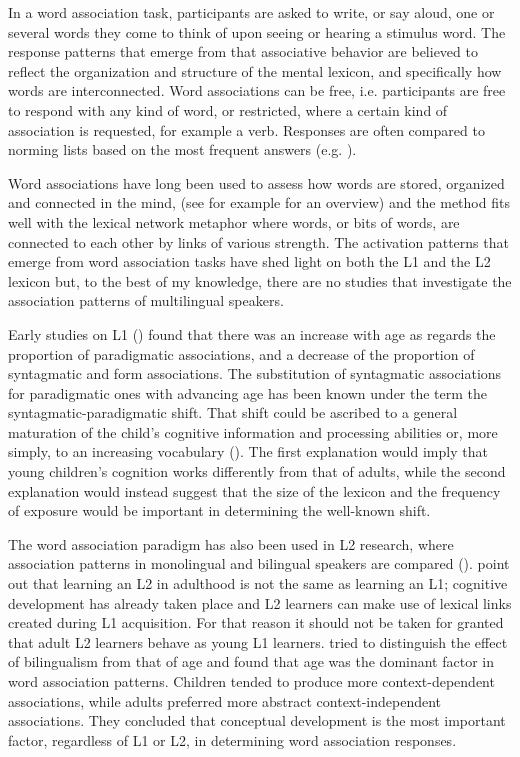 \documentclass[output=paper,colorlinks,citecolor=brown,nonflat]{langsci/langscibook}
\begin{document}
In a word association task, participants are asked to write, or say aloud, one or several words they come to think of upon seeing or hearing a stimulus word. The response patterns that emerge from that associative behavior are believed to reflect the organization and structure of the mental lexicon, and specifically how words are interconnected. Word associations can be free, i.e. participants are free to respond with any kind of word, or restricted, where a certain kind of association is requested, for example a verb. Responses are often compared to norming lists based on the most frequent answers (e.g. \citealt{PostmanKeppel1970}).

Word associations have long been used to assess how words are stored, organized and connected in the mind, (see for example \citealt{Fitzpatrick2012} for an overview) and the method fits well with the lexical network metaphor where words, or bits of words, are connected to each other by links of various strength. The activation patterns that emerge from word association tasks have shed light on both the L1 and the L2 lexicon but, to the best of my knowledge, there are no studies that investigate the association patterns of multilingual speakers.

Early studies on L1 (\citealt{Ervin1961, EntwisleEtAl1964}) found that there was an increase with age as regards the proportion of paradigmatic associations, and a decrease of the proportion of syntagmatic and form associations. The substitution of syntagmatic associations for paradigmatic ones with advancing age has been known under the term the syntagmatic-paradigmatic shift. That shift could be ascribed to a general maturation of the child’s cognitive information and processing abilities or, more simply, to an increasing vocabulary (\citealt{StolzTiffany1971, CremerEtAl2010}). The first explanation would imply that young children’s cognition works differently from that of adults, while the second explanation would instead suggest that the size of the lexicon and the frequency of exposure would be important in determining the well-known shift.

The word association paradigm has also been used in L2 research, where association patterns in monolingual and bilingual speakers are compared (\citealt{Krzeminska-Adamek2014}). \citet{FitzpatrickIzura2011} point out that learning an L2 in adulthood is not the same as learning an L1; cognitive development has already taken place and L2 learners can make use of lexical links created during L1 acquisition. For that reason it should not be taken for granted that adult L2 learners behave as young L1 learners. \citet{CremerEtAl2010} tried to distinguish the effect of bilingualism from that of age and found that age was the dominant factor in word association patterns. Children tended to produce more context-dependent associations, while adults preferred more abstract context-independent associations. They concluded that conceptual development is the most important factor, regardless of L1 or L2, in determining word association responses.
\end{document}

